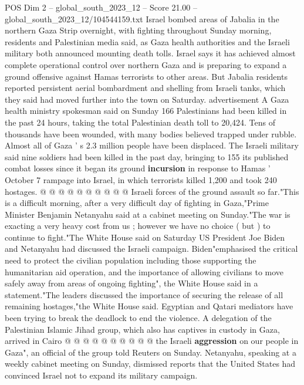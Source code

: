 \begin{textsample}{POS Dim 2 – global\_south\_2023\_12 – Score 21.00 – global\_south\_2023\_12/104544159.txt}  \label{ex:f2_pos_156}
Israel bombed areas of Jabalia in the northern Gaza Strip overnight, with fighting throughout Sunday morning, residents and Palestinian media said, as Gaza health authorities and the Israeli military both announced mounting death tolls.
Israel says it has achieved almost complete operational control over northern Gaza and is preparing to expand a ground offensive against Hamas terrorists to other areas.
But Jabalia residents reported persistent aerial bombardment and shelling from Israeli tanks, which they said had moved further into the town on Saturday. advertisement A Gaza health ministry spokesman said on Sunday 166 Palestinians had been killed in the past 24 hours, taking the total Palestinian death toll to 20,424.
Tens of thousands have been wounded, with many bodies believed trapped under rubble.
Almost all of Gaza ' s 2.3 million people have been displaced.
The Israeli military said nine soldiers had been killed in the past day, bringing to 155 its published combat losses since it began its ground \textbf{incursion} in response to Hamas ' October 7 rampage into Israel, in which terrorists killed 1,200 and took 240 hostages. @ @ @ @ @ @ @ @ @ @ Israeli forces of the ground assault so far."This is a difficult morning, after a very difficult day of fighting in Gaza,"Prime Minister Benjamin Netanyahu said at a cabinet meeting on Sunday."The war is exacting a very heavy cost from us ; however we have no choice ( but ) to continue to fight."The White House said on Saturday US President Joe Biden and Netanyahu had discussed the Israeli campaign.
Biden"emphasised the critical need to protect the civilian population including those supporting the humanitarian aid operation, and the importance of allowing civilians to move safely away from areas of ongoing fighting", the White House said in a statement."The leaders discussed the importance of securing the release of all remaining hostages,"the White House said.
Egyptian and Qatari mediators have been trying to break the deadlock to end the violence.
A delegation of the Palestinian Islamic Jihad group, which also has captives in custody in Gaza, arrived in Cairo @ @ @ @ @ @ @ @ @ @ the Israeli \textbf{aggression} on our people in Gaza", an official of the group told Reuters on Sunday.
Netanyahu, speaking at a weekly cabinet meeting on Sunday, dismissed reports that the United States had convinced Israel not to expand its military campaign.

\end{textsample}
